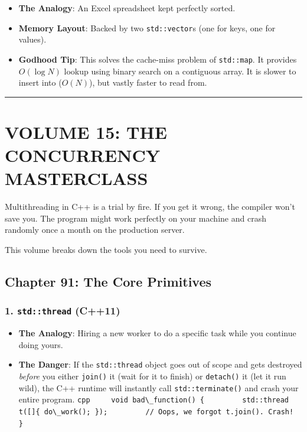 \begin{itemize}
\tightlist
\item
  \textbf{The Analogy}: An Excel spreadsheet kept perfectly sorted.
\item
  \textbf{Memory Layout}: Backed by two
  \passthrough{\lstinline!std::vector!}s (one for keys, one for values).
\item
  \textbf{Godhood Tip}: This solves the cache-miss problem of
  \passthrough{\lstinline!std::map!}. It provides \(O(\log N)\) lookup
  using binary search on a contiguous array. It is slower to insert into
  (\(O(N)\)), but vastly faster to read from.
\end{itemize}

\begin{center}\rule{0.5\linewidth}{0.5pt}\end{center}

\hypertarget{volume-15-the-concurrency-masterclass}{%
\section{VOLUME 15: THE CONCURRENCY
MASTERCLASS}\label{volume-15-the-concurrency-masterclass}}

Multithreading in C++ is a trial by fire. If you get it wrong, the
compiler won't save you. The program might work perfectly on your
machine and crash randomly once a month on the production server.

This volume breaks down the tools you need to survive.

\hypertarget{chapter-91-the-core-primitives}{%
\subsection{Chapter 91: The Core
Primitives}\label{chapter-91-the-core-primitives}}

\hypertarget{stdthread-c11}{%
\subsubsection{\texorpdfstring{1. \texttt{std::thread}
(C++11)}{1. std::thread (C++11)}}\label{stdthread-c11}}

\begin{itemize}
\tightlist
\item
  \textbf{The Analogy}: Hiring a new worker to do a specific task while
  you continue doing yours.
\item
  \textbf{The Danger}: If the \passthrough{\lstinline!std::thread!}
  object goes out of scope and gets destroyed \emph{before} you either
  \passthrough{\lstinline!join()!} it (wait for it to finish) or
  \passthrough{\lstinline!detach()!} it (let it run wild), the C++
  runtime will instantly call \passthrough{\lstinline!std::terminate()!}
  and crash your entire program.
  \passthrough{\lstinline"cpp     void bad\_function() \{         std::thread t([]\{ do\_work(); \});         // Oops, we forgot t.join(). Crash!     \}"}
\end{itemize}


